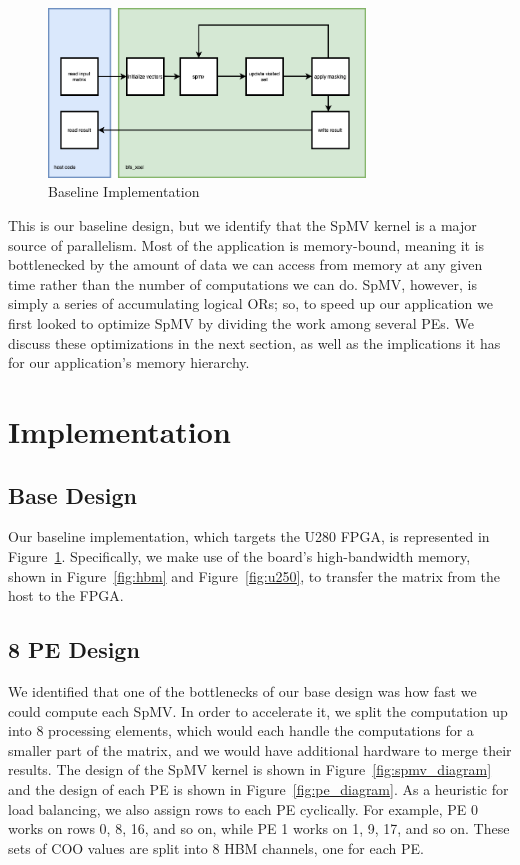 \documentclass[10pt]{article}
\begin{document}
\begin{figure}[h!]
  \centering
  \includegraphics[width=0.75\textwidth]{bfs_unopt.png}
  \caption{Baseline Implementation}
  \label{fig:baseline_impl}
\end{figure}

\noindent This is our baseline design, but we identify that the SpMV kernel is a major
source of parallelism. Most of the application is memory-bound, meaning it is
bottlenecked by the amount of data we can access from memory at any given time
rather than the number of computations we can do. SpMV, however, is simply a
series of accumulating logical ORs; so, to speed up our application we first
looked to optimize SpMV by dividing the work among several PEs. We discuss these
optimizations in the next section, as well as the implications it has for our
application's memory hierarchy.

\section{Implementation}

\subsection{Base Design}
\noindent Our baseline implementation, which targets the U280 FPGA, is represented in
Figure~\ref{fig:baseline_impl}. Specifically, we make use of the board's high-bandwidth memory, shown in
Figure~\ref{fig:hbm} and Figure~\ref{fig:u250}, to transfer the matrix from the host to the FPGA.

\subsection{8 PE Design}
\noindent We identified that one of the bottlenecks of our base design was how fast we could compute each SpMV.
In order to accelerate it, we split the computation up into 8 processing elements, which would each 
handle the computations for a smaller part of the matrix, and we would have additional hardware
to merge their results. The design of the SpMV kernel is shown in Figure~\ref{fig:spmv_diagram} and the
design of each PE is shown in Figure~\ref{fig:pe_diagram}. As a heuristic for load balancing, we also
assign rows to each PE cyclically. For example, PE 0 works on rows 0, 8, 16, and so on, while PE 1 works
on 1, 9, 17, and so on. These sets of COO values are split into 8 HBM channels, one for each PE. \newline
\end{document}
